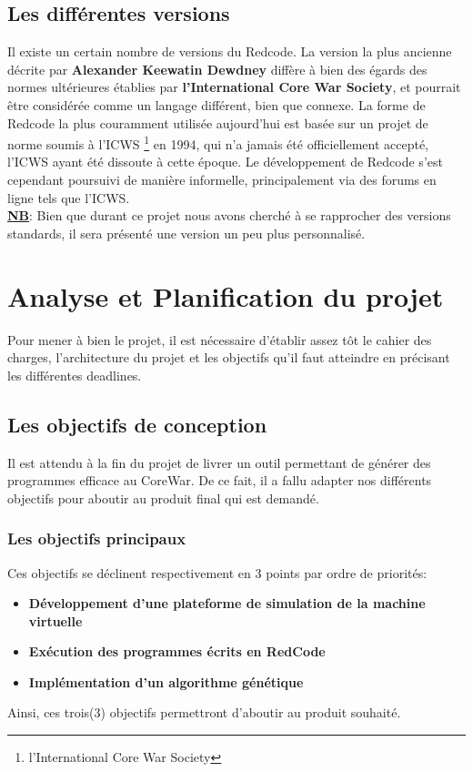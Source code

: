 \documentclass[12pt]{article}
\begin{document}
\subsection{Les différentes versions}
Il existe un certain nombre de versions du Redcode. La version la plus ancienne décrite par \textbf{\color{blue}Alexander Keewatin Dewdney} diffère à bien des égards des normes ultérieures établies par \textbf{l'International Core War Society}, et pourrait être considérée comme un langage différent, bien que connexe. La forme de Redcode la plus couramment utilisée aujourd'hui est basée sur un projet de norme soumis à l'ICWS \footnote{l'International Core War Society} en 1994, qui n'a jamais été officiellement accepté, l'ICWS ayant été dissoute à cette époque. Le développement de Redcode s'est cependant poursuivi de manière informelle, principalement via des forums en ligne tels que l'ICWS.\\

\underline{\textbf{\color{red}NB}}: Bien que durant ce projet nous avons cherché à se rapprocher des versions standards, il sera présenté une version un peu plus personnalisé.
\section{Analyse et Planification du projet}
Pour mener à bien le projet, il est nécessaire d'établir assez tôt le cahier des charges, l'architecture du projet et les objectifs qu'il faut atteindre en précisant les différentes deadlines.
\subsection{Les objectifs de conception}
Il est attendu à la fin du projet de livrer un outil permettant de générer des programmes efficace au CoreWar. De ce fait, il a fallu adapter nos différents objectifs pour aboutir au produit final qui est demandé.
\subsubsection*{Les objectifs principaux}
Ces objectifs se déclinent respectivement en 3 points par ordre de priorités:
\begin{itemize}
	\item \textbf{Développement d'une plateforme de simulation de la
		      machine virtuelle}
	\item \textbf{Exécution des programmes écrits en RedCode}
	\item \textbf{Implémentation d'un algorithme génétique}
\end{itemize}
Ainsi, ces trois(3) objectifs permettront d'aboutir au produit souhaité.
\end{document}
